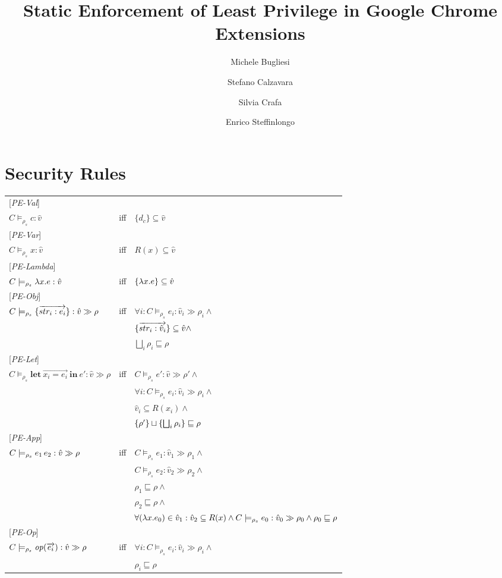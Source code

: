\documentclass[[12pt,a4paper,twoside,openrigh]{article}
\author{Michele Bugliesi \and Stefano Calzavara \and Silvia Crafa \and Enrico Steffinlongo}
\title{Static Enforcement of Least Privilege in Google Chrome Extensions}
\newcommand{\vat}[0]{\hat{v}}
\newcommand{\modelrho}{\models_{\rho_s}}
\newcommand{\letexprs}[3]{\mathbf{let}\ \vec{#1 = #2}\ \mathbf{in}\ #3}
\newcommand{\caesti}[2]{C \modelrho #1 : \vat_{#2} \gg \rho_{#2}}
\newcommand{\caest}[1]{C \modelrho #1 : \vat \gg \rho}
\begin{document}
\maketitle
\tableofcontents

\section{Security Rules}

\begin{tabular}{l l l}
{[\textit{PE-Val}]} \\
$C \modelrho c : \vat$ & iff & $\{d_c\} \subseteq \vat$ \\ 
{[\textit{PE-Var}]} \\
$C \modelrho x : \vat$ & iff & $R(x) \subseteq \vat$ \\ 
{[\textit{PE-Lambda}]} \\
$C \modelrho \lam{x}{e} : \vat$ & iff & $\{\lam{x}{e}\} \subseteq \vat$ \\
{[\textit{PE-Obj}]} \\
$\caest {\rec{\vec{str_i : e_i}}}$ & iff & $\forall i: \caesti {e_i} {i} \wedge$\\
&& $\rec{\vec{str_i :\vat_i}} \subseteq \vat \wedge$ \\
&& $\bigsqcup_{i} \rho_i \sqsubseteq \rho$ \\ 
{[\textit{PE-Let}]} \\
$\caest {\letexprs{x_i}{e_i}{e'}}$ & iff & $C \modelrho e' : \vat \gg \rho' \wedge$ \\
&& $ \forall i: \caesti {e_i} {i} \wedge$ \\
&& $\vat_i \subseteq R(x_i) \wedge$ \\
&& $ \{\rho'\} \sqcup \{\bigsqcup_i \rho_i\} \sqsubseteq \rho$ \\
{[\textit{PE-App}]} \\
$\caest {\appl {e_1} {e_2}}$ & iff & $ \caesti {e_1} {1} \wedge$ \\
&& $\caesti {e_2} {2} \wedge$ \\
&& $\rho_1 \sqsubseteq \rho \wedge$ \\
&& $\rho_2 \sqsubseteq \rho \wedge$ \\
&& $\forall (\lam{x}{e_0}) \in \vat_1 : \vat_2 \subseteq R(x) \wedge \caesti {e_0} {0} \wedge \rho_0 \sqsubseteq \rho $\\
{[\textit{PE-Op}]} \\
$\caest {\op (\vec{e_i})} $& iff &$\forall i : \caesti {e_i} {i} \wedge $\\
&& $\rho_i \sqsubseteq \rho$\\

\end{tabular}
\end{document}
